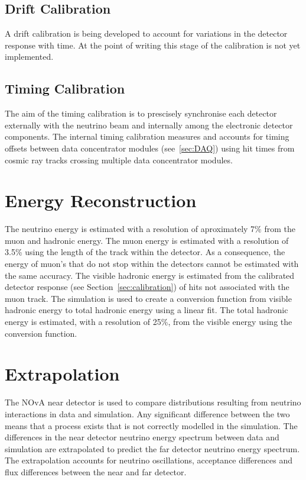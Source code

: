 \subsection{Drift Calibration}

A drift calibration is being developed to account for variations in
the detector response with time. At the point of writing this stage of
the calibration is not yet implemented.


\subsection{Timing Calibration}

The aim of the timing calibration is to prescisely synchronise each
detector externally with the neutrino beam and internally among
the electronic detector components. 
The internal timing calibration measures and accounts for timing
offsets between data concentrator modules (see~\ref{sec:DAQ}) using
hit times from cosmic ray tracks crossing multiple data concentrator
modules.~\cite{evanTiming}



\section{Energy Reconstruction}

The neutrino energy is estimated with a resolution of aproximately 7\%
from the muon and hadronic energy. 
The muon energy is estimated with a resolution of 3.5\% using the
length of the track within the detector.  
As a consequence, the energy of muon's that do not stop within the
detectors cannot be estimated with the same accuracy. 
The visible hadronic energy is estimated from the calibrated
detector response (see Section~\ref{sec:calibration}) of hits not
associated with the muon track. 
The simulation is used to create a conversion function from visible
hadronic energy to total hadronic energy using a linear fit. 
The total hadronic energy is estimated, with a resolution of 25\%,
from the visible energy using the conversion function.~\cite{NOvASA} 


\section{Extrapolation}\label{sec:extrap}
The NOvA near detector is used to compare distributions resulting from
neutrino interactions in data and simulation. Any significant
difference between the two means that a process exists that is not
correctly modelled in the simulation. 
The differences in the near detector neutrino energy spectrum between
data and simulation are extrapolated to predict the far detector
neutrino energy spectrum. The extrapolation accounts for neutrino
oscillations, acceptance differences and flux differences between the
near and far detector. 

